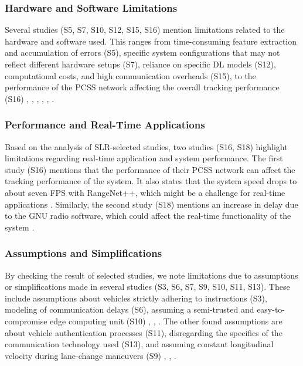 \documentclass[a4paper,12pt]{article}
\begin{document}
\subsubsection{Hardware and Software Limitations}
\hspace{5mm} Several studies (S5, S7, S10, S12, S15, S16) mention limitations related to the hardware and software used. This ranges from time-consuming feature extraction and accumulation of errors (S5), specific system configurations that may not reflect different hardware setups (S7), reliance on specific DL models (S12), computational costs, and high communication overheads (S15), to the performance of the PCSS network affecting the overall tracking performance (S16) \cite{s5}, \cite{s7}, \cite{s10}, \cite{s12}, \cite{s15}, \cite{s16}.

\subsubsection{Performance and Real-Time Applications}
\hspace{5mm} Based on the analysis of SLR-selected studies, two studies (S16, S18) highlight limitations regarding real-time application and system performance. The first study (S16) mentions that the performance of their PCSS network can affect the tracking performance of the system. It also states that the system speed drops to about seven FPS with RangeNet++, which might be a challenge for real-time applications \cite{s16}. Similarly, the second study (S18) mentions an increase in delay due to the GNU radio software, which could affect the real-time functionality of the system \cite{s18}.

\subsubsection{Assumptions and Simplifications}
\hspace{5mm} By checking the result of selected studies, we note limitations due to assumptions or simplifications made in several studies (S3, S6, S7, S9, S10, S11, S13). These include assumptions about vehicles strictly adhering to instructions (S3), modeling of communication delays (S6), assuming a semi-trusted and easy-to-compromise edge computing unit (S10) \cite{s3}, \cite{s6}, \cite{s10}. The other found assumptions are about vehicle authentication processes (S11), disregarding the specifics of the communication technology used (S13), and assuming constant longitudinal velocity during lane-change maneuvers (S9) \cite{s11}, \cite{s13}, \cite{s9}.
\end{document}
